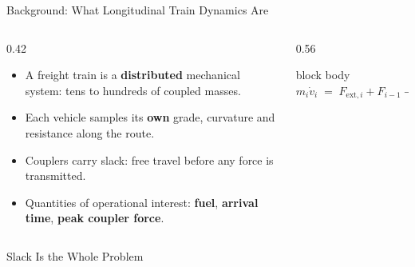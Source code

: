 \documentclass[aspectratio=169,11pt]{beamer}
\begin{document}
\begin{frame}{Background: What Longitudinal Train Dynamics Are}
  \begin{columns}[T,onlytextwidth]
    \begin{column}{0.42\textwidth}
      \begin{itemize}\setlength\itemsep{0.6em}
        \item A freight train is a \textbf{distributed} mechanical system:
              tens to hundreds of coupled masses.
        \item Each vehicle samples its \textbf{own} grade, curvature
              and resistance along the route.
        \item Couplers carry \alert{slack}: free travel before any force
              is transmitted.
        \item Quantities of operational interest: \textbf{fuel},
              \textbf{arrival time}, \textbf{peak coupler force}.
      \end{itemize}
    \end{column}
    \begin{column}{0.56\textwidth}
      \centering
      \vspace{0.6em}
      \scalebox{0.70}{\trainFBD}

      \vspace{1.8em}
      \begin{beamercolorbox}[wd=0.92\textwidth,sep=6pt,center]{block body}
        $m_i\dot v_i \;=\; F_{\mathrm{ext},i} + F_{i-1} - F_i$
      \end{beamercolorbox}
    \end{column}
  \end{columns}
\end{frame}

\begin{frame}{Slack Is the Whole Problem}
  \centering

  \vspace{0.3em}
\end{frame}
\end{document}
